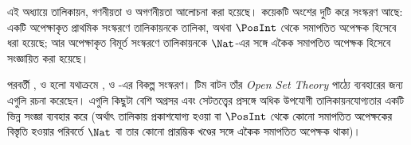 \documentclass[../../../include/open-logic-chapter]{subfiles}
\begin{document}

\begin{editorial}
এই অধ্যায়ে তালিকায়ন, গণনীয়তা ও অগণনীয়তা আলোচনা করা হয়েছে। কয়েকটি অংশের দুটি করে সংস্করণ আছে: একটি অপেক্ষাকৃত প্রাথমিক সংস্করণে তালিকায়নকে তালিকা, অথবা $\PosInt$ থেকে সমাপতিত অপেক্ষক হিসেবে ধরা হয়েছে; আর অপেক্ষাকৃত বিমূর্ত সংস্করণে তালিকায়নকে $\Nat$-এর সঙ্গে একৈক সমাপতিত অপেক্ষক হিসেবে সংজ্ঞায়িত করা হয়েছে।
\end{editorial}











\begin{editorial}
পরবর্তী ,
 ও  হলো যথাক্রমে ,
 ও -এর বিকল্প সংস্করণ। টিম বাটন তাঁর \emph{Open Set Theory} পাঠ্যে ব্যবহারের জন্য এগুলি রচনা করেছেন। এগুলি কিছুটা বেশি অগ্রসর এবং সেটতত্ত্বের প্রসঙ্গে অধিক উপযোগী তালিকায়নযোগ্যতার একটি ভিন্ন সংজ্ঞা ব্যবহার করে (অর্থাৎ তালিকায় প্রকাশযোগ্য হওয়া বা $\PosInt$ থেকে কোনো সমাপতিত অপেক্ষকের বিস্তৃতি হওয়ার পরিবর্তে $\Nat$ বা তার কোনো প্রারম্ভিক খণ্ডের সঙ্গে একৈক সমাপতিত অপেক্ষক থাকা)।
\end{editorial}


\OLEndChapterHook
\end{document}
